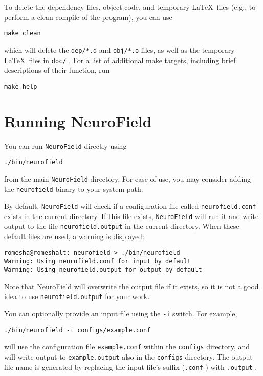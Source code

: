\documentclass[12pt,a4paper]{article}
\newcommand{\type}[1]{{\small\small\tt #1} }
\newcommand{\NF}[0]{\type{NeuroField}}
\begin{document}
To delete the dependency files, object code, and temporary \LaTeX\ files (e.g., to perform a clean compile of the program), you can use
\begin{lstlisting}
make clean
\end{lstlisting}
which will delete the \type{dep/*.d} and \type{obj/*.o} files, as well as the temporary \LaTeX\ files in \type{doc/}. For a list of additional make targets, including brief descriptions of their function, run
\begin{lstlisting}
make help
\end{lstlisting}

\section{Running NeuroField}
\label{sec:running}
You can run \NF directly using

\begin{lstlisting}
./bin/neurofield
\end{lstlisting}

from the main \NF directory. For ease of use, you may consider adding the \type{neurofield} binary to your system path.

By default, \NF will check if a configuration file called \type{neurofield.conf} exists in the current directory. If this file exists, \NF will run it and write output to the file \type{neurofield.output} in the current directory. When these default files are used, a warning is displayed:

\begin{lstlisting}
romesha@romeshalt: neurofield > ./bin/neurofield
Warning: Using neurofield.conf for input by default
Warning: Using neurofield.output for output by default
\end{lstlisting}

Note that NeuroField will overwrite the output file if it exists, so it is not a good idea to use \type{neurofield.output} for your work.

You can optionally provide an input file using the \type{-i} switch. For example,

\begin{lstlisting}
./bin/neurofield -i configs/example.conf
\end{lstlisting}

will use the configuration file \type{example.conf} within the \type{configs} directory, and will write output to \type{example.output} also in the \type{configs} directory. The output file name is generated by replacing the input file's suffix (\type{.conf}) with \type{.output}.
\end{document}
